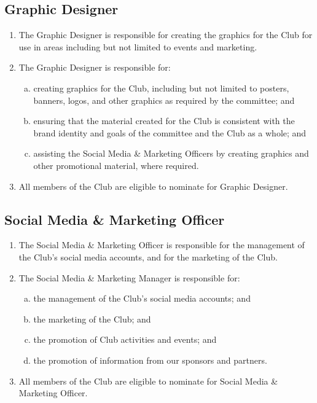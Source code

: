 \documentclass{schedule}
\begin{document}
\subsection{Graphic Designer}
\begin{enumerate}[(1)]
    \item The Graphic Designer is responsible for creating the graphics for the Club for use in areas including but not limited to events and marketing.
    \item The Graphic Designer is responsible for:
          \begin{enumerate}[(a)]
              \item creating graphics for the Club, including but not limited to posters, banners, logos, and other graphics as required by the committee; and
              \item ensuring that the material created for the Club is consistent with the brand identity and goals of the committee and the Club as a whole; and
              \item assisting the Social Media \& Marketing Officers by creating graphics and other promotional material, where required.
          \end{enumerate}
    \item All members of the Club are eligible to nominate for Graphic Designer.
\end{enumerate}

\subsection{Social Media \& Marketing Officer}
\begin{enumerate}[(1)]
    \item The Social Media \& Marketing Officer is responsible for the management of the Club's social media accounts, and for the marketing of the Club.
    \item The Social Media \& Marketing Manager is responsible for:
          \begin{enumerate}[(a)]
              \item the management of the Club's social media accounts; and
              \item the marketing of the Club; and
              \item the promotion of Club activities and events; and
              \item the promotion of information from our sponsors and partners.
          \end{enumerate}
    \item All members of the Club are eligible to nominate for Social Media \& Marketing Officer.
\end{enumerate}
\end{document}
